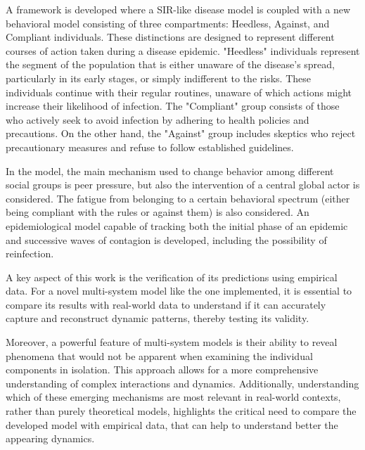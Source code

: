 A framework is developed where a SIR-like disease model is coupled with a new behavioral model consisting of three compartments: Heedless, Against, and Compliant individuals. These distinctions are designed to represent different courses of action taken during a disease epidemic.
"Heedless" individuals represent the segment of the population that is either unaware of the disease’s spread, particularly in its early stages, or simply indifferent to the risks. These individuals continue with their regular routines, unaware of which actions might increase their likelihood of infection.
The "Compliant" group consists of those who actively seek to avoid infection by adhering to health policies and precautions. On the other hand, the "Against" group includes skeptics who reject precautionary measures and refuse to follow established guidelines.

In the model, the main mechanism used to change behavior among different social groups is peer pressure, but also the intervention of a central global actor is considered. The fatigue from belonging to a certain behavioral spectrum (either being compliant with the rules or against them) is also considered. An epidemiological model capable of tracking both the initial phase of an epidemic and successive waves of contagion is developed, including the possibility of reinfection.

A key aspect of this work is the verification of its predictions using empirical data. For a novel multi-system model like the one implemented, it is essential to compare its results with real-world data to understand if it can accurately capture and reconstruct dynamic patterns, thereby testing its validity.

Moreover, a powerful feature of multi-system models is their ability to reveal phenomena that would not be apparent when examining the individual components in isolation. This approach allows for a more comprehensive understanding of complex interactions and dynamics. 
Additionally, understanding which of these emerging mechanisms are most relevant in real-world contexts, rather than purely theoretical models, highlights the critical need to compare the developed model with empirical data, that can help to understand better the appearing dynamics. 

